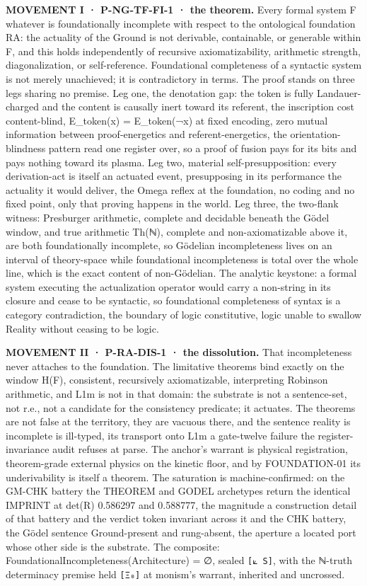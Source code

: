 \documentclass[10pt,twocolumn]{article}
\begin{document}
\textbf{MOVEMENT I · P-NG-TF-FI-1 · the theorem.} Every formal system F
whatever is foundationally incomplete with respect to the ontological
foundation RA: the actuality of the Ground is not derivable,
containable, or generable within F, and this holds independently of
recursive axiomatizability, arithmetic strength, diagonalization, or
self-reference. Foundational completeness of a syntactic system is not
merely unachieved; it is contradictory in terms. The proof stands on
three legs sharing no premise. Leg one, the denotation gap: the token is
fully Landauer-charged and the content is causally inert toward its
referent, the inscription cost content-blind, E\_token(x) = E\_token(¬x)
at fixed encoding, zero mutual information between proof-energetics and
referent-energetics, the orientation-blindness pattern read one register
over, so a proof of fusion pays for its bits and pays nothing toward its
plasma. Leg two, material self-presupposition: every derivation-act is
itself an actuated event, presupposing in its performance the actuality
it would deliver, the Omega reflex at the foundation, no coding and no
fixed point, only that proving happens in the world. Leg three, the
two-flank witness: Presburger arithmetic, complete and decidable beneath
the Gödel window, and true arithmetic Th(ℕ), complete and
non-axiomatizable above it, are both foundationally incomplete, so
Gödelian incompleteness lives on an interval of theory-space while
foundational incompleteness is total over the whole line, which is the
exact content of non-Gödelian. The analytic keystone: a formal system
executing the actualization operator would carry a non-string in its
closure and cease to be syntactic, so foundational completeness of
syntax is a category contradiction, the boundary of logic constitutive,
logic unable to swallow Reality without ceasing to be logic.

\textbf{MOVEMENT II · P-RA-DIS-1 · the dissolution.} That incompleteness
never attaches to the foundation. The limitative theorems bind exactly
on the window H(F), consistent, recursively axiomatizable, interpreting
Robinson arithmetic, and L1m is not in that domain: the substrate is not
a sentence-set, not r.e., not a candidate for the consistency predicate;
it actuates. The theorems are not false at the territory, they are
vacuous there, and the sentence reality is incomplete is ill-typed, its
transport onto L1m a gate-twelve failure the register-invariance audit
refuses at parse. The anchor's warrant is physical registration,
theorem-grade external physics on the kinetic floor, and by
FOUNDATION-01 its underivability is itself a theorem. The saturation is
machine-confirmed: on the GM-CHK battery the THEOREM and GODEL
archetypes return the identical IMPRINT at det(R) 0.586297 and 0.588777,
the magnitude a construction detail of that battery and the verdict
token invariant across it and the CHK battery, the Gödel sentence
Ground-present and rung-absent, the aperture a located port whose other
side is the substrate. The composite:
FoundationalIncompleteness(Architecture) = ∅, sealed
\texttt{{[}⟀\ S{]}}, with the ℕ-truth determinacy premise held
\texttt{{[}Ξ₀{]}} at monism's warrant, inherited and uncrossed.
\end{document}

